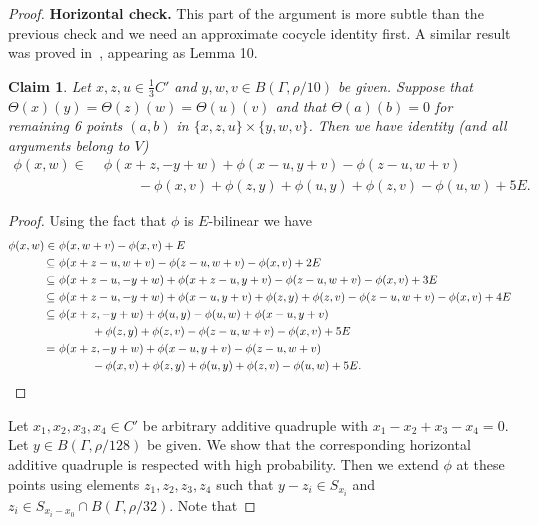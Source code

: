 \documentclass[a4paper,11pt]{article}
\numberwithin{theorem}{section}
\newtheorem{claim}[theorem]{Claim}
\theoremstyle{definition}
\begin{document}
\begin{proof}
    \noindent\textbf{Horizontal check.} This part of the argument is more subtle than the previous check and we need an approximate cocycle identity first. A similar result was proved in~\cite{extensionspaper}, appearing as Lemma 10.

    \begin{claim}\label{cocycleEqnBil}
        Let $x,z, u \in \frac{1}{3}C'$ and $y, w, v \in B(\Gamma, \rho/10)$ be given. Suppose that $\Theta(x)(y) = \Theta(z)(w) = \Theta(u)(v)$ and that $\Theta(a)(b) = 0$ for remaining 6 points $(a,b)$ in $\{x,z,u\} \times \{y, w, v\}$. Then we have identity (and all arguments belong to $V$)
        \begin{align*}\phi(x, w) \in\,\, &\phi(x + z, -y + w) + \phi(x  - u, y + v) - \phi(z - u, w + v)\\
        &\hspace{1cm} -\phi(x,v) + \phi(z,y) + \phi(u,y) + \phi(z,v) - \phi(u,w) + 5E.\end{align*}
    \end{claim}

    \begin{proof} Using the fact that $\phi$ is $E$-bilinear we have
        \begin{align*}\phi(x, w) \in\,\, & \phi(x, w + v) - \phi(x, v) + E\\
        \subseteq\,\,&\phi(x + z - u, w + v) - \phi(z - u, w + v) - \phi(x, v) + 2E \\
        \subseteq\,\,&\phi(x + z - u, -y + w) + \phi(x + z - u, y + v) - \phi(z - u, w + v) - \phi(x, v) + 3E \\
        \subseteq\,\,&\phi(x + z - u, - y + w) + \phi(x  - u, y + v) + \phi(z, y) + \phi(z, v) - \phi(z - u, w + v) - \phi(x, v) + 4E\\
        \subseteq\,\,&\phi(x + z, -y + w)  + \phi(u, y) - \phi(u,w) + \phi(x  - u, y + v)\\
        &\hspace{1cm}+ \phi(z, y) + \phi(z, v) - \phi(z - u, w + v) - \phi(x, v) + 5E\\
        =\,\,&\phi(x + z, -y + w) + \phi(x  - u, y + v) - \phi(z - u, w + v)\\
        &\hspace{1cm} -\phi(x,v) + \phi(z,y) + \phi(u,y) + \phi(z,v) - \phi(u,w) + 5E.\qedhere\end{align*}
    \end{proof}
    
    Let $x_1, x_2, x_3, x_4 \in C'$ be arbitrary additive quadruple with $x_1 - x_2 + x_3 - x_4 = 0$. Let $y \in B(\Gamma, \rho/128)$ be given. We show that the corresponding horizontal additive quadruple is respected with high probability. Then we extend $\phi$ at these points using elements $z_1, z_2, z_3, z_4$ such that $y - z_i \in S_{x_i}$ and $z_i \in S_{x_i - x_0} \cap B(\Gamma, \rho/32)$. Note that 
    

\end{proof}
\end{document}
